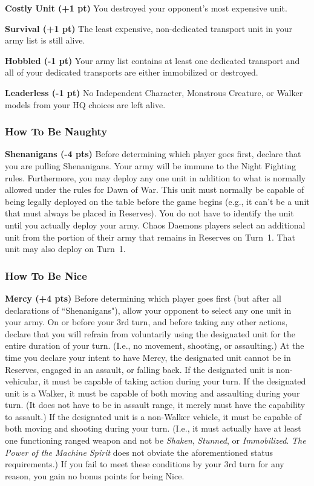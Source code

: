 \documentclass[12pt,titlepage]{article}
\newcommand{\paragraphsmall}[1]{\noindent\textbf{#1}\quad}
\begin{document}
{\paragraphsmall{Costly Unit (+1 pt)} You destroyed your opponent's most expensive unit.

\vspace{6pt}
\paragraphsmall{Survival (+1 pt)} The least expensive, non-dedicated transport unit in your army list is still alive.

\vspace{6pt}
\paragraphsmall{Hobbled (-1 pt)} Your army list contains at least one dedicated transport and all of your dedicated transports are either immobilized or destroyed.

\vspace{6pt}
\paragraphsmall{Leaderless (-1 pt)} No Independent Character, Monstrous Creature, or Walker models from your HQ choices are left alive.

\subsubsection*{How To Be Naughty}

\paragraphsmall{Shenanigans (-4 pts)} Before determining which player goes first, declare that you are pulling Shenanigans. Your army will be immune to the Night Fighting rules. Furthermore, you may deploy any one unit in addition to what is normally allowed under the rules for Dawn of War. This unit must normally be capable of being legally deployed on the table before the game begins (e.g., it can't be a unit that must always be placed in Reserves). You do not have to identify the unit until you actually deploy your army. Chaos Daemons players select an additional unit from the portion of their army that remains in Reserves on Turn~1. That unit may also deploy on Turn~1.

\subsubsection*{How To Be Nice}

\paragraphsmall{Mercy (+4 pts)} Before determining which player goes first (but after all declarations of ``Shenanigans"), allow your opponent to select any one unit in your army. On or before your 3rd turn, and before taking any other actions, declare that you will refrain from voluntarily using the designated unit for the entire duration of your turn. (I.e., no movement, shooting, or assaulting.) At the time you declare your intent to have Mercy, the designated unit cannot be in Reserves, engaged in an assault, or falling back. If the designated unit is non-vehicular, it must be capable of taking action during your turn. If the designated unit is a Walker, it must be capable of both moving and assaulting during your turn. (It does not have to be in assault range, it merely must have the capability to assault.) If the designated unit is a non-Walker vehicle, it must be capable of both moving and shooting during your turn. (I.e., it must actually have at least one functioning ranged weapon and not be \textit{Shaken}, \textit{Stunned}, or \textit{Immobilized}. \textit{The Power of the Machine Spirit} does not obviate the aforementioned status requirements.) If you fail to meet these conditions by your 3rd turn for any reason, you gain no bonus points for being Nice.
}
\end{document}
